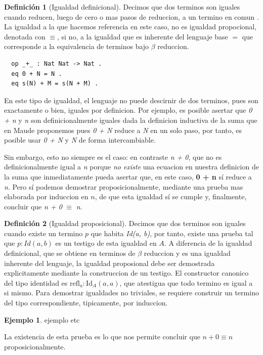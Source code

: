 \documentclass[a4paper,12pt]{report}
\theoremstyle{definition}
\newtheorem{definition}{Definici\'on}[chapter]
\newtheorem{example}{Ejemplo}[chapter]
\theoremstyle{plain}
\theoremstyle{remark}
\begin{document}
\begin{definition}[Igualdad definicional] Decimos que dos terminos son iguales cuando reducen, luego de cero o mas pasos de reduccion, a un termino en comun \cite{Minrat}. La igualdad a la que hacemos referencia en este caso, no es igualdad propocional, denotada con $\equiv$, si no, a la igualdad que es inherente del lenguaje base $=$ que corresponde a la equivalencia de terminos bajo $\beta$ reduccion. 
\begin{lstlisting}
  op _+_ : Nat Nat -> Nat .
  eq 0 + N = N .
  eq s(N) + M = s(N + M) .
\end{lstlisting}
En este tipo de igualdad, el lenguaje no puede descirnir de dos terminos, pues son exactamente o bien, iguales por definicion. Por ejemplo, es posible asertar que \textit{0 + n} y \textit{n} son definicionalmente iguales dada la definicion inductiva de la suma que en Maude proponemos pues  \textit{0 + N} reduce a \textit{N} en un  solo paso, por tanto, es posible usar \textit{0 + N} y \textit{N}  de forma intercambiable.
\newline


Sin embargo, esto no siempre es el caso: en contraste \textit{n + 0}, que no es definicionalmente igual a \textit{n} porque \textit{no existe} una ecuacion en nuestra definicion de la suma que inmediatamente pueda asertar que, en este caso, \textbf{0 + n} sí reduce a \textit{n}. Pero sí podemos demostrar proposicionalmente, mediante una prueba mas elaborada por induccion en $n$, de que esta igualdad sí se cumple y, finalmente, concluir que \textit{n + 0} $\equiv$ \textit{n}.
\end{definition}

\begin{definition}[Igualdad proposicional] Decimos que dos terminos son iguales cuando existe un termino $p$ que habita \textit{Id(a, b)}, por tanto, existe una prueba tal que $p : Id(a, b)$ es un testigo de esta igualdad en $A$. A diferencia de la igualdad definicional, que se obtiene en terminos de $\beta$ reduccion y es una igualdad inherente del lenguaje, la igualdad proposional debe ser demostrada explicitamente mediante la construccion de un testigo. El constructor canonico del tipo identidad es $\text{refl}_a : \text{Id}_A(a, a)$, que atestigua que todo termino es igual a si mismo. Para demostrar igualdades no triviales, se requiere construir un termino del tipo correspondiente, tipicamente, por induccion.
\newline
\begin{example}
ejemplo etc
\end{example}

La existencia de esta prueba es lo que nos permite concluir que $n + 0 \equiv n$ proposicionalmente.
\end{definition}
\end{document}
